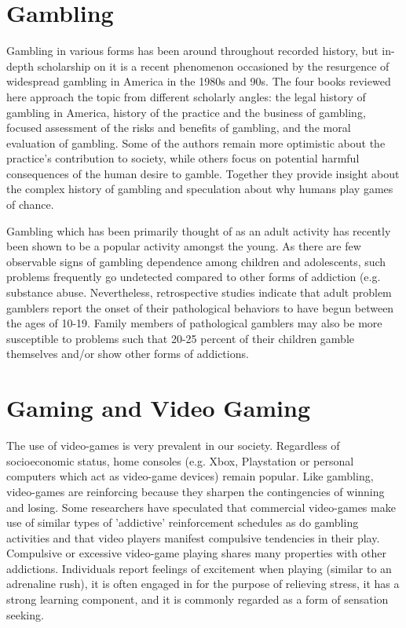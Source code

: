 \documentclass{article}
\begin{document}
\section{Gambling}
Gambling in various forms has been around throughout recorded history,
but in-depth scholarship on it is a recent phenomenon occasioned by the
resurgence of widespread gambling in America in the 1980s and 90s. The
four books reviewed here approach the topic from different scholarly angles:
the legal history of gambling in America, history of the practice and the
business of gambling, focused assessment of the risks and benefits of gambling, and the moral evaluation of gambling. Some of the authors remain
more optimistic about the practice’s contribution to society, while others
focus on potential harmful consequences of the human desire to gamble.
Together they provide insight about the complex history of gambling and
speculation about why humans play games of chance.\cite{kuss2012online} \cite{kuss2013internet} \cite{national1999pathological}

Gambling which has been primarily thought of as an adult activity
has recently been shown to be a popular activity amongst the young. As there are few observable signs of gambling dependence among children and adolescents, such problems frequently go undetected compared to other forms of addiction (e.g.
substance abuse. Nevertheless, retrospective studies indicate that adult problem gamblers report the onset of their pathological behaviors to have begun between the ages of 10-19. Family members of pathological gamblers may also be more susceptible to problems such that 20-25 percent of their children gamble themselves and/or show other forms of addictions.\cite{ko2009brain}\cite{young2009understanding} \cite{parker2008problem}

\section{Gaming and Video Gaming}
The use of video-games is very prevalent in our society. Regardless of socioeconomic status, home consoles (e.g. Xbox, Playstation or personal computers which act as video-game devices) remain popular. Like gambling, video-games are reinforcing because they sharpen the contingencies of winning and losing. Some researchers have speculated that commercial video-games make use of similar types of 'addictive' reinforcement schedules as do gambling activities and that video players manifest compulsive tendencies in their play. Compulsive or excessive video-game playing shares many properties with other addictions. Individuals report feelings of excitement when playing (similar to an adrenaline rush), it is often engaged in for the purpose of relieving stress, it has a strong learning component, and it is commonly regarded as a form of sensation seeking.\cite{dowling2005electronic} \cite{king2020convergence}
\end{document}
